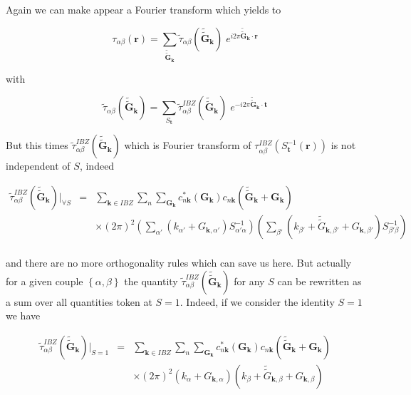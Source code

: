 \documentclass[a4paper,12pt]{report}
\begin{document}
Again we can make appear a Fourier transform which yields to

\begin{equation}
\tau_{\alpha\beta}(\mathbf{r}) = \sum_{\tilde{\tilde{\mathbf{G}}}_{\mathbf{k}}} \tilde{\tau}_{\alpha\beta}(\tilde{\tilde{\mathbf{G}}}_{\mathbf{k}})\; e^{i2\pi \tilde{\tilde{\mathbf{G}}}_{\mathbf{k}} \cdotp \mathbf{r} }
\end{equation}

with

\begin{equation}
\tilde{\tau}_{\alpha\beta}(\tilde{\tilde{\mathbf{G}}}_{\mathbf{k}}) = \sum_{S_{\mathbf{t}}} \tilde{\tau}_{\alpha\beta}^{IBZ}(\tilde{\tilde{\mathbf{G}}}_{\mathbf{k}})\; e^{-i2\pi \tilde{\tilde{\mathbf{G}}}_{\mathbf{k}} \cdot \mathbf{t}}
\end{equation}

But this times $\tilde{\tau}_{\alpha\beta}^{IBZ}(\tilde{\tilde{\mathbf{G}}}_{\mathbf{k}})$ which is Fourier transform of $\tau_{\alpha\beta}^{IBZ}\left(S_{\mathbf{t}}^{-1}(\mathbf{r})\right)$ is not independent of $S$, indeed

\begin{eqnarray}
\tilde{\tau}_{\alpha\beta}^{IBZ}(\tilde{\tilde{\mathbf{G}}}_{\mathbf{k}})\bigl\vert_{\forall S} &=& \sum_{\mathbf{k} \in IBZ} \sum_n \sum_{\mathbf{G}_{\mathbf{k}}} c_{n\mathbf{k}}^{*}(\mathbf{G}_{\mathbf{k}}) c_{n\mathbf{k}}(\tilde{\tilde{\mathbf{G}}}_{\mathbf{k}}+\mathbf{G}_{\mathbf{k}})  \nonumber \\
&&\times  (2\pi)^2 \left(\sum_{\alpha'}\left( k_{\alpha'} + G_{\mathbf{k},\alpha'}\right) S_{\alpha'\alpha}^{-1} \right) \left(\sum_{\beta'}\left( k_{\beta'} + \tilde{\tilde{G}}_{\mathbf{k},\beta'} + G_{\mathbf{k},\beta'}\right) S_{\beta'\beta}^{-1} \right) \nonumber \\
\label{eqtildetaualphabetaIBZ}
\end{eqnarray}

and there are no more orthogonality rules which can save us here. But actually for a given couple $\left\lbrace \alpha,\beta\right\rbrace $ the quantity $\tilde{\tau}_{\alpha\beta}^{IBZ}(\tilde{\tilde{\mathbf{G}}}_{\mathbf{k}})$ for any $S$ can be rewritten as a sum over all quantities token at $S=1$. Indeed, if we consider the identity $S=1$ we have

\begin{eqnarray}
\tilde{\tau}_{\alpha\beta}^{IBZ}(\tilde{\tilde{\mathbf{G}}}_{\mathbf{k}})\bigl\vert_{S=1} &=& \sum_{\mathbf{k} \in IBZ} \sum_n \sum_{\mathbf{G}_{\mathbf{k}}} c_{n\mathbf{k}}^{*}(\mathbf{G}_{\mathbf{k}}) c_{n\mathbf{k}}(\tilde{\tilde{\mathbf{G}}}_{\mathbf{k}}+\mathbf{G}_{\mathbf{k}})  \nonumber \\
&&\times  (2\pi)^2 \left( k_{\alpha} + G_{\mathbf{k},\alpha}\right) \left( k_{\beta} + \tilde{\tilde{G}}_{\mathbf{k},\beta} + G_{\mathbf{k},\beta}\right)
\end{eqnarray}
\end{document}
